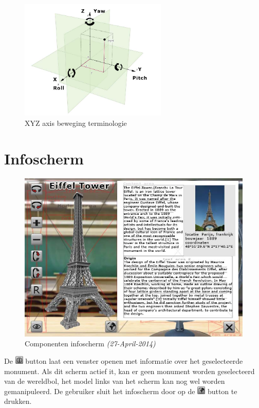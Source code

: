 \begin{figure}[h]
  \centering
  \includegraphics[width=70mm]{figs/terminology.jpg}
  \caption{XYZ axis beweging terminologie}
  \label{fig:termi}
\end{figure}

\newpage
\section{Infoscherm} \label{sec:infoscherm}
\begin{figure}[h]
  \includegraphics[width=130mm]{figs/components2.jpg}
  \caption{Componenten infoscherm \textit{(27-April-2014)}}
  \label{fig:components2}
\end{figure}
De \includegraphics[width=15px]{figs/button10.png} button laat een venster openen met informatie over het geselecteerde monument. Als dit scherm actief it, kan er geen monument worden geselecteerd van de wereldbol, het model links van het scherm kan nog wel worden gemanipuleerd. De gebruiker sluit het infoscherm door op de \includegraphics[width=15px]{figs/button11.png} button te drukken.


